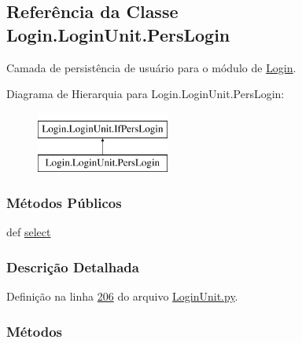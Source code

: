 \hypertarget{classLogin_1_1LoginUnit_1_1PersLogin}{}\subsection{Referência da Classe Login.\+Login\+Unit.\+Pers\+Login}
\label{classLogin_1_1LoginUnit_1_1PersLogin}


Camada de persistência de usuário para o módulo de \hyperlink{namespaceLogin}{Login}.  


Diagrama de Hierarquia para Login.\+Login\+Unit.\+Pers\+Login\+:\begin{figure}[H]
\begin{center}
\leavevmode
\includegraphics[height=2.000000cm]{d5/dfc/classLogin_1_1LoginUnit_1_1PersLogin}
\end{center}
\end{figure}
\subsubsection*{Métodos Públicos}
\begin{DoxyCompactItemize}
\item 
def \hyperlink{classLogin_1_1LoginUnit_1_1PersLogin_a1847dbd744377283add2327d2eb0b99f}{select}
\end{DoxyCompactItemize}


\subsubsection{Descrição Detalhada}


Definição na linha \hyperlink{LoginUnit_8py_source_l00206}{206} do arquivo \hyperlink{LoginUnit_8py_source}{Login\+Unit.\+py}.



\subsubsection{Métodos}
\hypertarget{classLogin_1_1LoginUnit_1_1PersLogin_a1847dbd744377283add2327d2eb0b99f}{}
